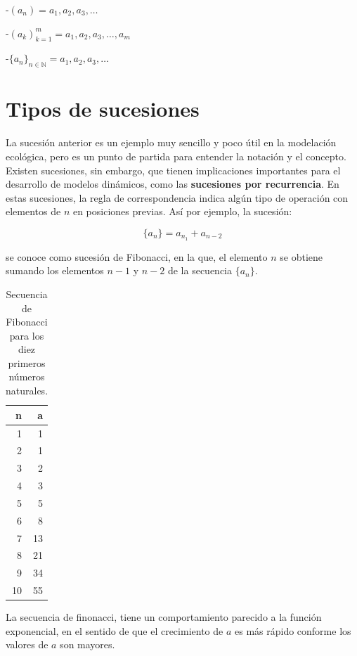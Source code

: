 \documentclass[
]{book}
\begin{document}
-\((a_n) = a_1, a_2, a_3, \dots\)

-\((a_k)_{k=1}^m = a_1, a_2, a_3, \dots, a_m\)

-\(\{a_n\}_{n \in \mathbb{N}} = a_1, a_2, a_3, \dots\)

\hypertarget{tipos-de-sucesiones}{%
\section{Tipos de sucesiones}\label{tipos-de-sucesiones}}

La sucesión anterior es un ejemplo muy sencillo y poco útil en la modelación ecológica, pero es un punto de partida para entender la notación y el concepto. Existen sucesiones, sin embargo, que tienen implicaciones importantes para el desarrollo de modelos dinámicos, como las \textbf{sucesiones por recurrencia}. En estas sucesiones, la regla de correspondencia indica algún tipo de operación con elementos de \(n\) en posiciones previas. Así por ejemplo, la sucesión:

\begin{equation}
\{a_n\} = a_{n_1} + a_{n-2} \label{eq:fibonacci}
\end{equation}

se conoce como sucesión de Fibonacci, en la que, el elemento \(n\) se obtiene sumando los elementos \(n-1\) y \(n-2\) de la secuencia \(\{a_n\}\).

\begin{table}

\caption{\label{tab:fibo-tabla}Secuencia de Fibonacci para los diez primeros números naturales.}
\centering
\begin{tabular}[t]{r|r}
\hline
n & a\\
\hline
1 & 1\\
\hline
2 & 1\\
\hline
3 & 2\\
\hline
4 & 3\\
\hline
5 & 5\\
\hline
6 & 8\\
\hline
7 & 13\\
\hline
8 & 21\\
\hline
9 & 34\\
\hline
10 & 55\\
\hline
\end{tabular}
\end{table}

La secuencia de finonacci, tiene un comportamiento parecido a la función exponencial, en el sentido de que el crecimiento de \(a\) es más rápido conforme los valores de \(a\) son mayores.
\end{document}
